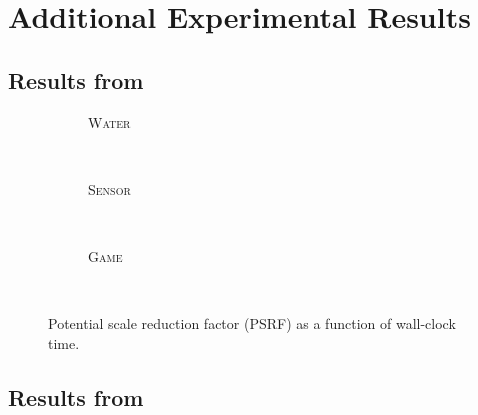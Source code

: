 \chapter{Additional Experimental Results}

\section{Results from }

\setlength{}
\setlength{}
\renewcommand{\subflen}{1.0\textwidth}
\begin{figure}[h!]
  \begin{subfigure}[b]{\subflen}
    \centering
    
    \vspace{-0.5em}
    \caption{\textsc{Water}}
    \label{fig:water1_time}
  \end{subfigure}\\
  \begin{subfigure}[b]{\subflen}
    \centering
    
    \vspace{-0.5em}
    \caption{\textsc{Sensor}}
    \label{fig:berkeley1_time}
  \end{subfigure}\\
  \begin{subfigure}[b]{\subflen}
    \centering
    
    \vspace{-0.5em}
    \caption{\textsc{Game}}
    \label{fig:hots1_time}
  \end{subfigure}\\[-1em]
  \caption{
    Potential scale reduction factor (PSRF) as a function of wall-clock time.
    }
  \label{fig:exptime}
\end{figure}


\section{Results from }

